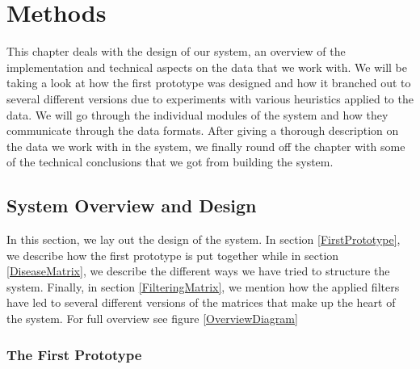 \chapter{Methods\label{Methods}}

This chapter deals with the design of our system, an overview of the
implementation and technical aspects on the data that we work with. We
will be taking a look at how the first prototype was designed and how
it branched out to several different versions due to experiments with
various heuristics applied to the data. We will go through the
individual modules of the system and how they communicate through the
data formats. After giving a thorough description on the data we work
with in the system, we finally round off the chapter with some of the
technical conclusions that we got from building the system.

\section{System Overview and Design\label{SystemOverviewAndDesign}}

In this section, we lay out the design of the system. In section
\ref{FirstPrototype}, we describe how the first prototype is put
together while in section \ref{DiseaseMatrix}, we describe the
different ways we have tried to structure the system. Finally, in section
\ref{FilteringMatrix}, we mention how the applied filters have led to
several different versions of the matrices that make up the heart of
the system. For full overview see figure \ref{OverviewDiagram}

\subsection{The First Prototype\label{FirstPrototype}}

